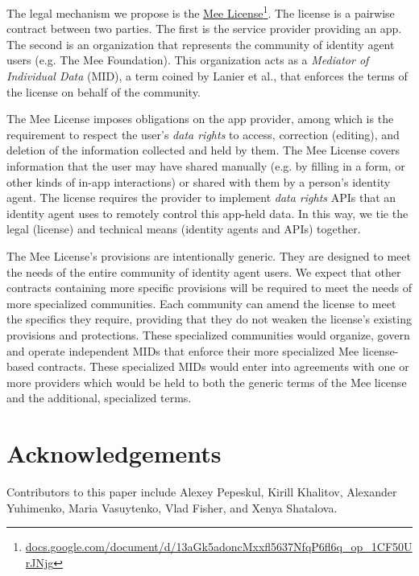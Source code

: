 \documentclass[11pt, oneside]{article}   	%
\newcommand{\hyperfootnote}[1][]{\def\ArgI{{#1}}\hyperfootnoteRelay}
\newcommand\hyperfootnoteRelay[2][]{\href{#1#2}{\ArgI}\footnote{\href{#1#2}{#2}}}
\begin{document}
The legal mechanism we propose is the \hyperfootnote[Mee License][https://]{docs.google.com/document/d/13aGk5adoncMxxfl5637NfqP6fl6q\_op\_1CF50UrJNjg}. The license is a pairwise contract between two parties. The first is the service provider providing an app. The second is an organization that represents the community of identity agent users (e.g. The Mee Foundation). This organization acts as a \emph{Mediator of Individual Data} (MID), a term coined by Lanier et al.\cite{Lanier2018}, that enforces the terms of the license on behalf of the community. 

The Mee License imposes obligations on the app provider, among which is the requirement to respect the user's \emph{data rights} to access, correction (editing), and deletion of the information collected and held by them. The Mee License covers information that the user may have shared manually (e.g. by filling in a form, or other kinds of in-app interactions) or shared with them by a person's identity agent. The license requires the provider to implement \emph{data rights} APIs that an identity agent uses to remotely control this app-held data. In this way, we tie the legal (license) and technical means (identity agents and APIs) together.

The Mee License's provisions are intentionally generic. They are designed to meet the needs of the entire community of identity agent users. We expect that other contracts containing more specific provisions will be required to meet the needs of more specialized communities. Each community can amend the license to meet the specifics they require, providing that they do not weaken the license's existing provisions and protections. These specialized communities would organize, govern and operate independent MIDs that enforce their more specialized Mee license-based contracts. These specialized MIDs would enter into agreements with one or more providers which would be held to both the generic terms of the Mee license and the additional, specialized terms.

\section{Acknowledgements} %
Contributors to this paper include Alexey Pepeskul, Kirill Khalitov, Alexander Yuhimenko, Maria Vasuytenko, Vlad Fisher, and Xenya Shatalova.



\end{document}
